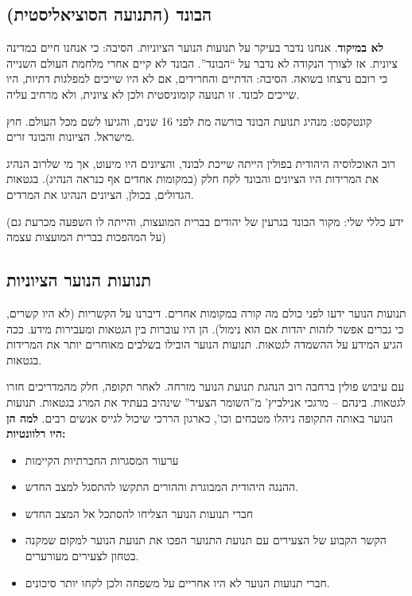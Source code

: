 \documentclass[a4paper]{book}
\begin{document}
	
	\subsection{הבונד (התנועה הסוציאליסטית)}
	\textbf{לא במיקוד}. 
	אנחנו נדבר בעיקר על תנועות הנוער הציוניות. הסיבה: כי אנחנו חיים במדינה ציונית. אז לצורך הנקודה לא נדבר על ``הבונד''. הבונד לא קיים אחרי מלחמת העולם השנייה כי רובם נרצחו בשואה. הסיבה: הדתיים והחרידים, אם לא היו שייכים למפלגות דתיות, היו שייכים לבונד. זו תנועה קומוניסטית ולכן לא ציונית, ולא מרחיב עליה. 
	
	קונטקסט: מנהיג תנועת הבונד בורשה מת לפני 16 שנים, והגיעו לשם מכל העולם. חוץ מישראל. הציונות והבונד זרים. 
	
	רוב האוכלוסיה היהודית בפולין הייתה שייכת לבונד, והציונים היו מיעוט, אך מי שלרוב הנהיג את המרידות היו הציונים והבונד לקח חלק (במקומות אחדים אף כנראה הנהיג). בגטאות הגדולים, בכולן, הציונים הנהיגו את המרדים. 
	
	(ידע כללי שלי: מקור הבונד בגרעין של יהודים בברית המועצות, והייתה לו השפעה מכרעת גם על המהפכות בברית המועצות עצמה)
	
	\subsection{תנועות הנוער הציוניות}
	תנועות הנוער ידעו לפני כולם מה קורה במקומות אחרים. דיברנו על הקשריות (לא היו קשרים, כי גברים אפשר לזהות יהדות אם הוא נימול). הן היו עוברות בין הגטאות ומעבירות מידע. ככה הגיע המידע על ההשמדה לגטאות. תנועות הנוער הובילו בשלבים מאוחרים יותר את המרידות בגטאות. 
	
	עם עיבוש פולין ברחבה רוב הנהגת תנועת הנוער מזרחה. לאחר תקופה, חלק מהמדריכים חזרו לגטאות. בינהם – מרגכי אנילביץ' מ''השומר הצעיר'' שינהיב בעתיד את המרג בגטאות. תנועות הנוער באותה התקופה ניהלו מטבחים וכו', כארגון הררכי שיכול לגייס אנשים רבים. \textbf{למה הן היו רלוונטיות: }
	\begin{itemize}
		\item ערעור המסגרות החברתיות הקיימות
		\item ההנגה היהודית המבוגרת וההורים התקשו להתסגל למצב החדש. 
		\item חברי תנועות הנוער הצליחו להסתכל אל המצב החדש
		\item הקשר הקבוע של הצעירים עם תנועת התנוער הפכו את תנועת הנוער למקום שמקנה בטחון לצעירים מעורערים. 
		\item חברי תנועות הנוער לא היו אחריים על משפחה ולכן לקחו יותר סיכונים. 
	\end{itemize}
	
\end{document}
